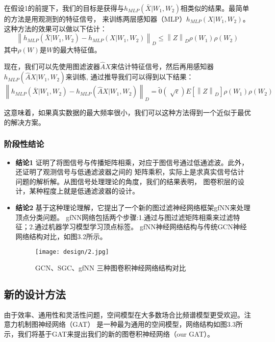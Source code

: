 在假设1的前提下，我们的目标是获得与$ h_{MLP}(\bar{X}|W_1,W_2) $相类似的结果。最简单的方法是用观测到的特征信号，
来训练两层感知器（MLP）$ h_{MLP}(X|W_1,W_2) $。这种方法的效果可以做以下估计：
$$  \left \| h_{MLP}(\bar{X}|W_1,W_2) - h_{MLP}(X|W_1,W_2) \right \|_{D}  \le  \left \| Z \right \|_{D} \rho(W_{1}) \rho(W_{2}) $$
其中$ \rho(W) $是$W$的最大特征值。

现在，我们可以先使用图滤波器$ \hat{A}X $来估计特征信号，然后再用感知器$ h_{MLP}(\hat{A}X|W_1,W_2) $来训练,
通过推导我们可以得到以下结果：
$$  \left \| h_{MLP}(\bar{X}|W_1,W_2) - h_{MLP}(\hat{A}X|W_1,W_2) \right \|_{D}  =  \tilde{0}(\sqrt[]{\epsilon }) E[\left \| Z \right \|_{D}] \rho(W_{1}) \rho(W_{2}) $$

这意味着，如果真实数据的最大频率很小，我们可以这种方法得到一个近似于最优的解决方案。

\subsubsection{阶段性结论}

\begin{itemize}
    \item \textbf{结论1} \quad
    证明了将图信号与传播矩阵相乘，对应于图信号通过低通滤波。此外，还证明了观测信号与低通滤波器之间的
    矩阵乘积，实际上是求真实信号估计问题的解析解。从图信号处理理论的角度，我们的结果表明，
    图卷积层的设计，某种程度上就是低通滤波器的设计。
    
    \item \textbf{结论2} \quad
    基于这种理论理解，它提出了一个新的图过滤神经网络框架gfNN来处理顶点分类问题。
    gfNN网络包括两个步骤:1.通过与图过滤矩阵相乘来过滤特征；2.通过机器学习模型学习顶点标签。
    gfNN神经网络结构与传统GCN神经网络结构对比，如图3.2所示。
    \begin{figure}[ht]
        \centering
        \captionsetup{width=10cm}
        \texttt{[image: design/2.jpg]}
        \caption{\label{3-2}GCN、SGC、gfNN 三种图卷积神经网络结构对比}
    \end{figure}
\end{itemize}

\subsection{新的设计方法}
由于效率、通用性和灵活性问题，空间模型在大多数场合比频谱模型更受欢迎。注意力机制图神经网络（GAT）
是一种最为通用的空间模型，网络结构如图3.3所示，我们将基于GAT来提出我们的新的图卷积神经网络（our GAT）。

